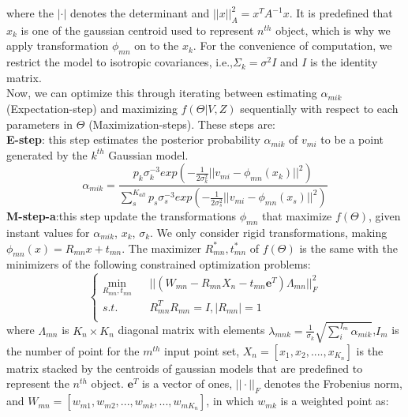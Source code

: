 where the $|\cdot|$ denotes the determinant and $||x||_A^2=x^TA^{-1}x$. It is predefined that $x_k$ is one of the gaussian centroid used to represent $n^{th}$ object, which is why we apply transformation $\phi_{mn}$ on to the $x_k$. For the convenience of computation, we restrict the model to isotropic covariances, i.e.,$\Sigma_k=\sigma^2I$ and $I$ is the identity matrix.\\
Now, we can optimize this through iterating between estimating $\alpha_{mik}$ (Expectation-step) and maximizing $f(\Theta|V,Z)$ sequentially with respect to each parameters in $\Theta$ (Maximization-steps).
These steps are:\\
\textbf{E-step}:
this step estimates the posterior probability $\alpha_{mik}$ of $v_{mi}$ to be a point generated by the $k^{th}$ Gaussian model.\\
\begin{equation}
\label{equ:estep}
\alpha_{mik}=\frac{p_k\sigma_k^{-3}exp(-\frac{1}{2\sigma_k^2}||v_{mi}-\phi_{mn}(x_k)||^2)}{\sum_s^{K_{all}}p_s\sigma_s^{-3}exp(-\frac{1}{2\sigma_s^2}||v_{mi}-\phi_{mn}(x_s)||^2)}
\end{equation}
\textbf{M-step-a}:this step update the transformations $\phi_{mn}$ that maximize $f(\Theta)$, given instant values for $\alpha_{mik}$, $x_k$, $\sigma_k$. We only consider rigid transformations, making  $\phi_{mn}(x)=R_{mn}x+t_{mn}$. The maximizer $R_{mn}^*,t_{mn}^*$  of $f(\Theta)$ is the same with the minimizers of the following constrained optimization problems:\\
\begin{equation}
\left\{
\begin{array}{rcl}
\min_{R_{mn},t_{mn}}&      &||(W_{mn}-R_{mn}X_n-t_{mn}\mathbf{e}^T)\Lambda_{mn}||_F^2\\
s.t.&      &R_{mn}^TR_{mn}=I, |R_{mn}|=1\\
\end{array} \right.
\end{equation}
where $\Lambda_{mn}$ is $K_n \times K_n$ diagonal matrix with elements $\lambda_{mnk}=\frac{1}{\sigma_k}\sqrt{\sum_i^{I_{m}}\alpha_{mik}}$,$I_m$ is the number of point for the $m^{th}$ input point set, $X_n = [x_1,x_2,....,x_{K_n}]$ is the matrix stacked by the centroids of gaussian models that are predefined to represent the $n^{th}$ object. $\mathbf{e}^T$ is a vector of ones, $||\cdot||_F$ denotes the Frobenius norm, and $W_{mn}=[w_{m1},w_{m2},...,w_{mk},...,w_{mK_n}]$, in which $w_{mk}$ is a weighted point as:\\
